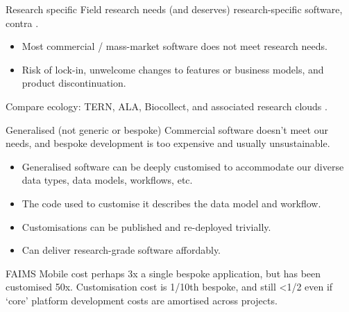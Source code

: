\begin{frame}{Research specific}
    Field research needs (and deserves) research-specific software, contra \parencite{Roosevelt2015-kd}.
      \begin{itemize}
        \item Most commercial / mass-market software does not meet research needs.
        \item Risk of lock-in, unwelcome changes to features or business models, and product discontinuation.
    \end{itemize}
    \medskip{}
    Compare ecology: TERN, ALA, Biocollect, and associated research clouds \parencite{Tern2019-sp, Ala2019-by, Ala2019-cb}.
\end{frame}
\begin{frame}{Generalised (not generic or bespoke)}
  Commercial software doesn't meet our needs, and bespoke development is too expensive and usually unsustainable.
      \begin{itemize}
        \item Generalised software can be deeply customised to accommodate our diverse data types, data models, workflows, etc.
        \item The code used to customise it describes the data model and workflow.
        \item Customisations can be published and re-deployed trivially.
        \item Can deliver research-grade software affordably.  
    \end{itemize}
    FAIMS Mobile cost perhaps 3x a single bespoke application, but has been customised 50x. Customisation cost is 1/10th bespoke, and still <1/2 even if `core' platform development costs are amortised across projects.
\end{frame}
